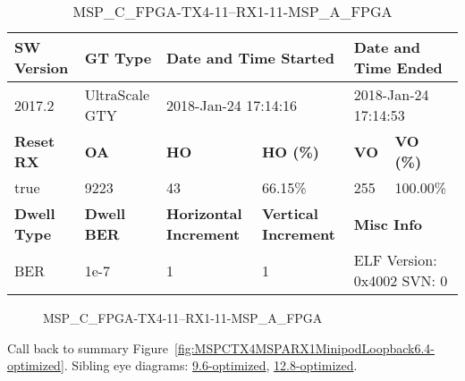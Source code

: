 \begin{table}[h]
\centering
\caption{MSP\_C\_FPGA-TX4-11--RX1-11-MSP\_A\_FPGA}
\label{tab:MSPCFPGATX411RX111MSPAFPGA6.4-optimized}
\begin{tabular}{@{}|l|l|l|l|l|l|@{}}
\toprule
\textbf{SW Version}                & \textbf{GT Type}   & \multicolumn{2}{l|}{\textbf{Date and Time Started}}            & \multicolumn{2}{l|}{\textbf{Date and Time Ended}}        \\ \midrule
2017.2                       & UltraScale GTY          & \multicolumn{2}{l|}{2018-Jan-24 17:14:16}                   & \multicolumn{2}{l|}{2018-Jan-24 17:14:53}               \\ \midrule
\textbf{Reset RX}                  & \textbf{OA} & \textbf{HO}   & \textbf{HO (\%)} & \textbf{VO} & \textbf{VO (\%)} \\ \midrule
true & 9223        & 43          & 66.15\%        & 255        & 100.00\%       \\ \midrule
\textbf{Dwell Type}                & \textbf{Dwell BER} & \textbf{Horizontal Increment} & \textbf{Vertical Increment}    & \multicolumn{2}{l|}{\textbf{Misc Info}}                  \\ \midrule
BER                            & 1e-7        & 1        & 1           & \multicolumn{2}{l|}{ELF Version: 0x4002 SVN: 0}                         \\ \bottomrule
\end{tabular}
\end{table}

\begin{figure}[h]
\caption{MSP\_C\_FPGA-TX4-11--RX1-11-MSP\_A\_FPGA} \label{fig:MSPCFPGATX411RX111MSPAFPGA6.4-optimized}
\end{figure}

Call back to summary Figure~\ref{fig:MSPCTX4MSPARX1MinipodLoopback6.4-optimized}.
Sibling eye diagrams: \hyperref[sec:MSPCFPGATX411RX111MSPAFPGA9.6-optimized]{9.6-optimized}, \hyperref[sec:MSPCFPGATX411RX111MSPAFPGA12.8-optimized]{12.8-optimized}.

\clearpage
\newpage

